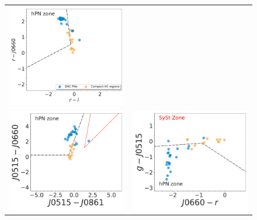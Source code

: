 \documentclass[11pt]{article}
\newcommand\raiselabel[1]{\raisebox{0.9\figwidth}[-0.5\figwidth]{#1}}
\begin{document}
\begin{figure}
  \centering
\begin{tabular}{l l}
\includegraphics[width=0.5\linewidth, trim=10 10 10 10, clip]{Fig1-pne-smc-splus-match-2007-compat-HIIRegions-smc-match-splus-vironen.pdf} & \\
 \includegraphics[width=0.5\linewidth, trim=10 10 10 10, clip]{Fig2-pne-smc-splus-match-2007-compat-HIIRegions-smc-match-splus-J0515_J0660.pdf} & \includegraphics[width=0.5\linewidth, trim=10 10 10 10, clip]{Fig4-pne-smc-splus-match-2007-compat-HIIRegions-smc-match-splus-g.pdf} \\

\end{tabular}
\end{figure}
\end{document}
